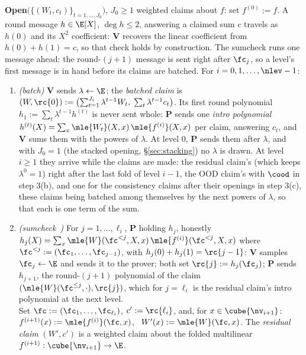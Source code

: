 \begin{protocol}
\smallskip
\textbf{Open}$\bigl(\{(W_t, c_t)\}_{t = 1, \dots, J_0}\bigr)$, $J_0 \ge 1$ weighted claims about $f$: set $f^{(0)} := f$. A round message $h \in \E[X]$, $\deg h \le 2$, answering a claimed sum $c$ travels as $h(0)$ and its $X^2$ coefficient: $\mathbf{V}$ recovers the linear coefficient from $h(0) + h(1) = c$, so that check holds by construction. The sumcheck runs one message ahead: the round-$(j{+}1)$ message is sent right after $\fc_j$, so a level's first message is in hand before its claims are batched. For $i = 0, 1, \dots, \nlev - 1$:
\begin{enumerate}[itemsep=0.5pt,topsep=2pt]
\item \emph{(batch)} $\mathbf{V}$ sends $\lambda \leftarrow \E$; the \emph{batched claim} is $(W, \rc{0}) := \bigl(\sum_{t = 1}^{J_i} \lambda^{t-1} W_t,\; \sum_{t} \lambda^{t-1} c_t\bigr)$. Its first round polynomial $h_1 := \sum_t \lambda^{t-1} h^{(t)}$ is never sent whole: $\mathbf{P}$ sends one \emph{intro polynomial} $h^{(t)}(X) = \sum_{x} \mle{W_t}(X, x)\, \mle{f^{(i)}}(X, x)$ per claim, answering $c_t$, and $\mathbf{V}$ sums them with the powers of $\lambda$. At level $0$, $\mathbf{P}$ sends them after $\lambda$, and with $J_0 = 1$ (the stacked opening, \S\ref{sec:stacking}) no $\lambda$ is drawn. At level $i \ge 1$ they arrive while the claims are made: the residual claim's (which keeps $\lambda^0 = 1$) right after the last fold of level $i-1$, the OOD claim's with $\cood$ in step 3(b), and one for the consistency claims after their openings in step 3(c), these claims being batched among themselves by the next powers of $\lambda$, so that each is one term of the sum.
\item \emph{(sumcheck~\cite{LFKN92})} For $j = 1, \dots, \ell_i$, $\mathbf{P}$ holding $h_j$, honestly $h_j(X) = \sum_{x} \mle{W}(\fc^{<j}, X, x)\, \mle{f^{(i)}}(\fc^{<j}, X, x)$ where $\fc^{<j} := (\fc_1, \dots, \fc_{j-1})$, with $h_j(0) + h_j(1) = \rc{j-1}$: $\mathbf{V}$ samples $\fc_j \leftarrow \E$ and sends it to the prover; both set $\rc{j} := h_j(\fc_j)$; $\mathbf{P}$ sends $h_{j+1}$, the round-$(j{+}1)$ polynomial of the claim $(\mle{W}(\fc^{\le j}, \cdot), \rc{j})$, which for $j = \ell_i$ is the residual claim's intro polynomial at the next level.\\
Set $\fc := (\fc_1, \dots, \fc_{\ell_i})$, $c' := \rc{\ell_i}$, and, for $x \in \cube{\nv_{i+1}}$: \ $f^{(i+1)}(x) := \mle{f^{(i)}}(\fc, x)$, \ $W'(x) := \mle{W}(\fc, x)$. The \emph{residual claim} $(W', c')$ is a weighted claim about the folded multilinear $f^{(i+1)} : \cube{\nv_{i+1}} \to \E$.

\end{enumerate}
\end{protocol}
